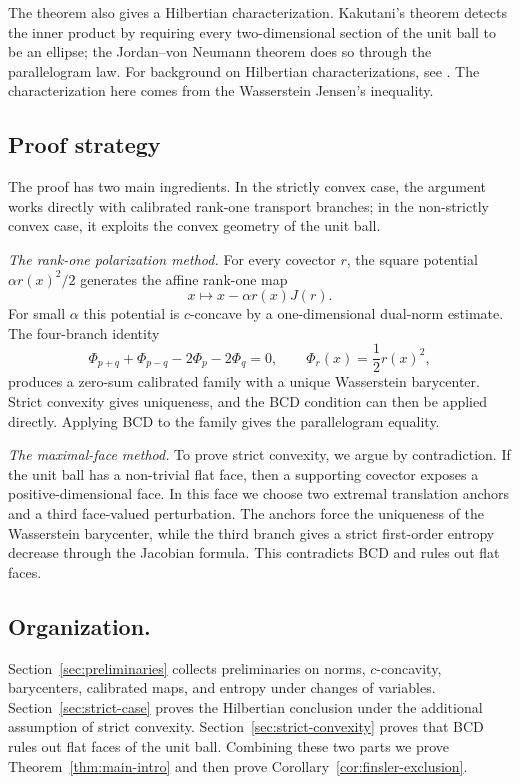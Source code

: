 \documentclass[a4paper,11pt]{article}
\numberwithin{equation}{section}
\begin{document}
	\medskip
	
	The theorem also gives a Hilbertian characterization. Kakutani's theorem \cite{Kakutani1939} detects the inner product by requiring every two-dimensional section of the unit ball to be an ellipse; the Jordan--von Neumann theorem \cite{JordanvonNeumann1935} does so through the parallelogram law. For background on Hilbertian characterizations, see \cite{Amir1986}. The characterization here comes from the Wasserstein Jensen's inequality.
	
	\medskip
	
	\subsection*{Proof strategy}\label{subsec:proof-strategy}
	The proof has two main ingredients. In the strictly convex case, the argument works directly with calibrated rank-one transport branches; in the non-strictly convex case, it exploits the convex geometry of the unit ball.
	
	
	
	
	\medskip\noindent\textit{The rank-one polarization method.}
	For every covector \(r\), the square potential \(\alpha r(x)^2/2\) generates the affine rank-one map
	\[
	x\longmapsto x-\alpha r(x)J(r).
	\]
	For small \(\alpha\) this potential is \(c\)-concave by a one-dimensional dual-norm estimate. The four-branch identity
	\[
	\Phi_{p+q}+\Phi_{p-q}-2\Phi_p-2\Phi_q=0,
	\qquad \Phi_r(x)=\frac12r(x)^2,
	\]
	produces a zero-sum calibrated family with a unique Wasserstein barycenter. Strict convexity gives uniqueness, and the BCD condition can then be applied directly. Applying BCD to the family gives the parallelogram equality.
	
	\medskip\noindent\textit{The maximal-face method.} To prove strict convexity, we argue by contradiction. If the unit ball has a non-trivial flat face, then a supporting covector exposes a positive-dimensional face. In this face we choose two extremal translation anchors and a third face-valued perturbation. The anchors force the uniqueness of the Wasserstein barycenter, while the third branch gives a strict first-order entropy decrease through the Jacobian formula. This contradicts BCD and rules out flat faces.
	
	
	
	\medskip
	
	\subsection*{Organization.}\label{subsec:organization}
	Section~\ref{sec:preliminaries} collects preliminaries on norms, \(c\)-concavity, barycenters, calibrated maps, and entropy under changes of variables. Section~\ref{sec:strict-case} proves the Hilbertian conclusion under the additional assumption of strict convexity. Section~\ref{sec:strict-convexity} proves that BCD rules out flat faces of the unit ball.  Combining these two parts we  prove Theorem~\ref{thm:main-intro} and then prove Corollary~\ref{cor:finsler-exclusion}.
	
\end{document}
